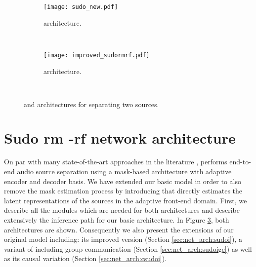 \begin{figure}[!htb]
    \centering
  \begin{subfigure}[h]{\linewidth}
      \texttt{[image: sudo\_new.pdf]}
      \caption{\sudo architecture.}
      \label{fig:sudormrf} 
     \end{subfigure} \\
 \begin{subfigure}[h]{\linewidth}
      \texttt{[image: improved\_sudormrf.pdf]}
      \caption{\sudoi architecture.}
      \label{fig:sudormrfi} 
     \end{subfigure} \\
    \caption{\sudo and \sudoi architectures for separating two sources.}
    \label{fig:sudormrf_all}
\end{figure} 

\section{Sudo rm -rf network architecture}
\label{sec:net_arch}
On par with many state-of-the-art approaches in the literature \cite{luo2019convTasNet,tzinis2019two,luo2019dual,defossez2019demucs}, \sudo performs end-to-end audio source separation using a mask-based architecture with adaptive encoder and decoder basis. We have extended our basic model in order to also remove the mask estimation process by introducing \sudoi that directly estimates the latent representations of the sources in the adaptive front-end domain. First, we describe all the modules which are needed for both architectures and describe extensively the inference path for our basic \sudo architecture. In Figure \ref{fig:sudormrf_all}, both architectures are shown. Consequently we also present the extensions of our original \sudo model including: its improved version \sudoi (Section \ref{sec:net_arch:sudoi}), a variant of \sudoi including group communication \cite{luo2020groupcomm} (Section \ref{sec:net_arch:sudoigc}) as well as its causal variation \csudoi (Section \ref{sec:net_arch:csudoi}). 

